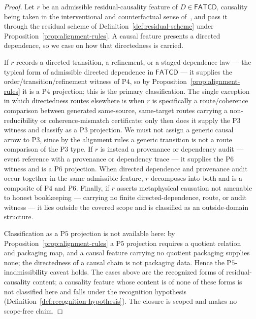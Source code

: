 \documentclass[11pt]{article}
\theoremstyle{definition}
\newcommand{\FATCD}{\ensuremath{\mathsf{FATCD}}}
\newcommand{\Pthree}{\ensuremath{\mathrm{P3}}}
\newcommand{\Pfour}{\ensuremath{\mathrm{P4}}}
\newcommand{\Pfive}{\ensuremath{\mathrm{P5}}}
\newcommand{\Psix}{\ensuremath{\mathrm{P6}}}
\begin{document}
\begin{proof}
Let \(r\) be an admissible residual-causality feature of
\(D \in \FATCD{}\), causality being taken in the interventional and
counterfactual sense of~\citet{Pearl2009}, and pass it through the
residual scheme of Definition~\ref{def:residual-scheme} under
Proposition~\ref{prop:alignment-rules}. A causal feature presents a
directed dependence, so we case on how that directedness is carried.

If \(r\) records a directed transition, a refinement, or a
staged-dependence law --- the typical form of admissible directed
dependence in \FATCD{} --- it supplies the order/transition/refinement
witness of \Pfour{}, so by Proposition~\ref{prop:alignment-rules} it is
a \Pfour{} projection; this is the primary classification. The single
exception in which directedness routes elsewhere is when \(r\) is
specifically a route/coherence comparison between generated
same-source, same-target routes carrying a non-reducibility or
coherence-mismatch certificate; only then does it supply the \Pthree{}
witness and classify as a \Pthree{} projection. We must not assign a
generic causal arrow to \Pthree{}, since by the alignment rules a
generic transition is not a route comparison of the \Pthree{} type. If
\(r\) is instead a provenance or dependency audit --- event reference
with a provenance or dependency trace --- it supplies the \Psix{}
witness and is a \Psix{} projection. When directed dependence and
provenance audit occur together in the same admissible feature, \(r\)
decomposes into both and is a composite of \Pfour{} and \Psix{}.
Finally, if \(r\) asserts metaphysical causation not amenable to honest
bookkeeping --- carrying no finite directed-dependence, route, or audit
witness --- it lies outside the covered scope and is classified as an
outside-domain structure.

Classification as a \Pfive{} projection is not available here: by
Proposition~\ref{prop:alignment-rules} a \Pfive{} projection requires a
quotient relation and packaging map, and a causal feature carrying no
quotient packaging supplies none; the directedness of a causal chain is
not packaging data. Hence the \Pfive{}-inadmissibility caveat holds.
The cases above are the recognized forms of residual-causality content; a
causality feature whose content is of none of these forms is not classified here
and falls under the recognition hypothesis
(Definition~\ref{def:recognition-hypothesis}). The closure is scoped and makes no
scope-free claim.
\end{proof}
\end{document}

